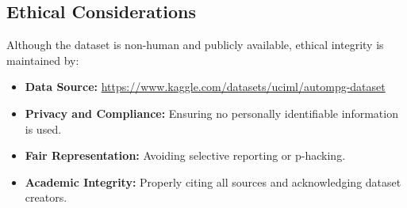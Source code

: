 \documentclass[12pt]{article}
\begin{document}
\subsection{Ethical Considerations}

Although the dataset is non-human and publicly available, ethical integrity is maintained by:

\begin{itemize}
    \item \textbf{Data Source:} \url{https://www.kaggle.com/datasets/uciml/autompg-dataset}
    \item \textbf{Privacy and Compliance:} Ensuring no personally identifiable information is used.
    \item \textbf{Fair Representation:} Avoiding selective reporting or p-hacking.
    \item \textbf{Academic Integrity:} Properly citing all sources and acknowledging dataset creators.
\end{itemize}
\end{document}
